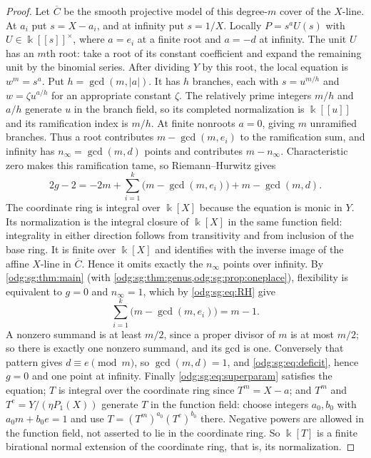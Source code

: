 \documentclass[11pt,oneside]{article}
\numberwithin{equation}{section}
\theoremstyle{definition}
\theoremstyle{remark}
\begin{document}
\begin{proof}
Let $\overline C$ be the smooth projective model of this degree-$m$ cover of
the $X$-line. At $a_i$ put $s=X-a_i$, and at infinity put $s=1/X$.
Locally $P=s^a U(s)$ with $U\in\Bbbk[[s]]^\times$, where $a=e_i$ at a finite
root and $a=-d$ at infinity. The unit $U$ has an $m$th root: take a root of
its constant coefficient and expand the remaining unit by the binomial series.
After dividing $Y$ by this root, the local equation is $w^m=s^a$.
Put $h=\gcd(m,|a|)$. It has $h$ branches, each with
$s=u^{m/h}$ and $w=\zeta u^{a/h}$ for an appropriate constant $\zeta$.
The relatively prime integers $m/h$ and $a/h$ generate $u$ in the branch
field, so its completed normalization is $\Bbbk[[u]]$ and its ramification
index is $m/h$. At finite nonroots $a=0$, giving $m$ unramified branches.
Thus a root contributes $m-\gcd(m,e_i)$ to the ramification sum, and
infinity has $n_\infty=\gcd(m,d)$ points and contributes $m-n_\infty$.
Characteristic zero makes this ramification tame, so Riemann--Hurwitz
\cite{StacksRH} gives
\begin{equation}\label{odg:sg:eq:RH}
 2g-2=-2m+\sum_{i=1}^k\bigl(m-\gcd(m,e_i)\bigr)+m-\gcd(m,d).
\end{equation}
The coordinate ring is integral over $\Bbbk[X]$ because the equation is
monic in $Y$. Its normalization is the integral closure of $\Bbbk[X]$ in
the same function field: integrality in either direction follows from
transitivity and from inclusion of the base ring. It is finite over
$\Bbbk[X]$ and identifies with the inverse image of the affine $X$-line
in $\overline C$. Hence it omits exactly the $n_\infty$ points over infinity. By
\cref{odg:sg:thm:main} (with \cref{odg:sg:thm:genus,odg:sg:prop:oneplace}), flexibility is
equivalent to $g=0$ and $n_\infty=1$, which by \eqref{odg:sg:eq:RH} give
\begin{equation}\label{odg:sg:eq:deficit}
 \sum_{i=1}^k\bigl(m-\gcd(m,e_i)\bigr)=m-1 .
\end{equation}
A nonzero summand is at least $m/2$, since a proper divisor of $m$ is at most $m/2$; so
there is exactly one nonzero summand, and its gcd is one. Conversely that pattern gives
$d\equiv e\pmod m$, so $\gcd(m,d)=1$, and \eqref{odg:sg:eq:deficit}, hence $g=0$ and one
point at infinity. Finally \eqref{odg:sg:eq:superparam} satisfies the equation; $T$ is
integral over the coordinate ring since $T^m=X-a$; and $T^m$ and $T^e=Y/(\eta P_1(X))$
generate $T$ in the function field: choose integers $a_0,b_0$ with
$a_0m+b_0e=1$ and use $T=(T^m)^{a_0}(T^e)^{b_0}$ there. Negative powers
are allowed in the function field, not asserted to lie in the coordinate ring.
So $\Bbbk[T]$ is a finite
birational normal extension of the coordinate ring, that is, its normalization.
\end{proof}
\end{document}
